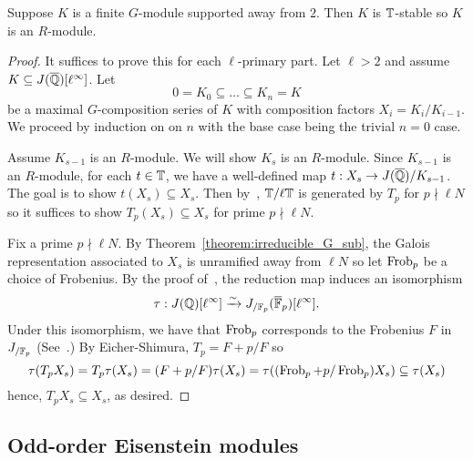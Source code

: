 \documentclass{article}
\begin{document}
\begin{theorem}\label{theorem:G_modules_are_Hecke}
    Suppose $K$ is a finite $G$-module supported away from $2$. Then $K$ is
    $\mathbb{T}$-stable so $K$ is an $R$-module.
\end{theorem}
\begin{proof}
    It suffices to prove this for each $\ell$-primary part. Let $\ell>2$ and
    assume $K\subseteq J(\overline{\mathbb{Q}})[\ell^\infty]$. Let
    \[
        0 = K_0 \subseteq \ldots \subseteq K_n = K
    \]
    be a maximal $G$-composition series of $K$ with composition factors $X_i =
    K_i/K_{i-1}$. We proceed by induction on on $n$ with the base
    case being the trivial $n=0$ case. 
    
    Assume $K_{s-1}$ is an $R$-module. We will show $K_s$ is an $R$-module.
    Since $K_{s-1}$ is an $R$-module, for each $t\in \mathbb{T}$, we have a
    well-defined map $t:X_s\to J(\overline{\mathbb{Q}})/K_{s-1}$. The goal is to show
    $t(X_s)\subseteq X_s$. Then by~\cite[Prop. 6.1]{MR1610883}, $\mathbb{T}/\ell \mathbb{T}$
    is generated by $T_p$ for $p\nmid \ell N$ so it suffices to show
    $T_p(X_s)\subseteq X_s$ for prime $p\nmid \ell N$.

    Fix a prime $p\nmid \ell N$. By Theorem~\ref{theorem:irreducible_G_sub},
    the Galois representation associated to $X_s$ is unramified away from $\ell
    N$ so let $\operatorname{Frob}_p$ be a choice of Frobenius. By the proof of~\cite[Lemma
    12.6.2]{ribet-stein:mod}, the reduction map induces an isomorphism
    \[
        \tau:J(\mathbb{Q})[\ell^\infty] \xrightarrow{\sim} J_{/\mathbb{F}_p} (\overline{\mathbb{F}}_p)[\ell^\infty].
    \]
    Under this isomorphism, we have that $\operatorname{Frob}_p$ corresponds to the Frobenius
    $F$ in $J_{/\mathbb{F}_p}$ (See~\cite[\S 5.3]{ribet-stein:serre}.) By
    Eicher-Shimura, $T_p = F+p/F$ so
    \[
    \tau(T_p X_s) 
    = T_p\tau(X_s) 
    = (F+p/F)\tau(X_s)
    = \tau((\operatorname{Frob}_p+p/\operatorname{Frob}_p)X_s)
    \subseteq \tau(X_s)
    \]
    hence, $T_p X_s\subseteq X_s$, as desired.
\end{proof}

\subsection{Odd-order Eisenstein modules}%
\label{sub:odd_order_eisenstein_modules}
\end{document}

